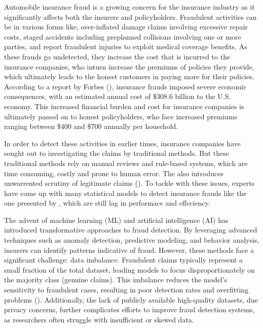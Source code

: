 \documentclass[twoside,11pt]{article}
\begin{document}
Automobile insurance fraud is a growing concern for the insurance industry as it significantly affects both the insurers and policyholders. Fraudulent activities can be in various forms like, over-inflated damage claims involving excessive repair costs, staged accidents including preplanned collisions involving one or more parties, and report fraudulent injuries to exploit medical coverage benefits. As these frauds go undetected, they increase the cost that is incurred to the insurance companies, who inturn increase the premiums of policies they provide, which ultimately leads to the honest customers in paying more for their policies. According to a report by Forbes (\citealp{kilroyInsuranceFraudStatistics2024}), insurance frauds imposed severe economic consequences, with an estimated annual cost of \$308.6 billion to the U.S. economy. This increased financial burden and cost for insurance companies is ultimately passed on to honest policyholders, who face increased premiums ranging between \$400 and \$700 annually per household.

In order to detect these activities in earlier times, insurance companies have sought out to investigating the claims by traditional methods. But these traditional methods rely on manual reviews and rule-based systems, which are time consuming, costly and prone to human error. The also introduces unwarrented scrutiny of legitimate claims (\citealp{AndreasRp,BERMUDEZ}). To tackle with these issues, experts have come up with many statistical models to detect insurance frauds like the one presented by \citealp{belhadjiModelDetectionInsurance2000}, which are still lag in performace and effeciency. 

The advent of machine learning (ML) and artificial intelligence (AI) has introduced transformative approaches to fraud detection. By leveraging advanced techniques such as anomaly detection, predictive modeling, and behavior analysis, insurers can identify patterns indicative of fraud. However, these methods face a significant challenge: data imbalance. Fraudulent claims typically represent a small fraction of the total dataset, leading models to focus disproportionately on the majority class (genuine claims). This imbalance reduces the model's sensitivity to fraudulent cases, resulting in poor detection rates and overfitting problems (\citealp{phuaComprehensiveSurveyData2012}). Additionally, the lack of publicly available high-quality datasets, due privacy concerns, further complicates efforts to improve fraud detection systems, as researchers often struggle with insufficient or skewed data.
\end{document}
